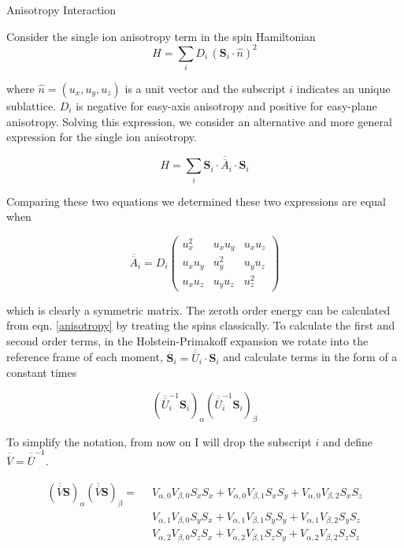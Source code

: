 \documentclass[12pt]{report}
\begin{document}
  
\begin{center}
\Large{Anisotropy Interaction}
\end{center}

Consider the single ion anisotropy term in the spin Hamiltonian
\begin{equation}
H = \sum_i D_i \,(\boldsymbol{S}_i \cdot \hat{n})^2
\end{equation}

where $\hat{n} = \left(u_x,u_y,u_z\right)$ is a unit vector and the subscript
$i$ indicates an unique sublattice. $D_i$ is negative for easy-axis anisotropy
and positive for easy-plane anisotropy. Solving this expression, we consider
an alternative and more general expression for the single ion anisotropy.
 
\begin{equation}
\label{anisotropy}
H = \sum_i \boldsymbol{S}_i \cdot \overline{\overline{A}}_i \cdot \boldsymbol{S}_i
\end{equation}

Comparing these two equations we determined these two expressions are
equal when 

\begin{equation}
\overline{\overline{A}}_i = D_i \left( 
\begin{matrix}
u_x^2 & u_x u_y & u_x u_z \\
u_x u_y & u_y^2 & u_y u_z \\
u_x u_z & u_y u_z & u_z^2
\end{matrix} 
\right)
\end{equation}

which is clearly a symmetric matrix. The zeroth order energy can be calculated from eqn. 
\ref{anisotropy} by treating the spins classically. To calculate the first and second order terms,
in the Holstein-Primakoff expansion we rotate into the reference frame of each moment, 
$\overline{\boldsymbol{S}}_i = \overline{\overline{U}}_i \cdot \boldsymbol{S}_i $ and calculate 
terms in the form of a constant times 

\begin{equation}
\left( \overline{\overline{U}}^{-1}_i \boldsymbol{S}_i \right)_{\alpha}
\left( \overline{\overline{U}}^{-1}_i \boldsymbol{S}_i \right)_{\beta}
\end{equation}

To simplify the notation, from now on I will drop the subscript $i$ and define $\overline{\overline{V}} = \overline{\overline{U}}^{-1}$. 


\begin{align*}
 (\overline{\overline{V}} \boldsymbol{S})_{\alpha} (\overline{\overline{V}} \boldsymbol{S})_{\beta} = \,\,\,
 &V_{\alpha,0} V_{\beta,0} S_x S_x + V_{\alpha,0} V_{\beta,1} S_x S_y +V_{\alpha,0} V_{\beta,2} S_x S_z \\
 &V_{\alpha,1} V_{\beta,0} S_y S_x + V_{\alpha,1} V_{\beta,1} S_y S_y +V_{\alpha,1} V_{\beta,2} S_y S_z \\
  &V_{\alpha,2} V_{\beta,0} S_z S_x + V_{\alpha,2} V_{\beta,1} S_z S_y +V_{\alpha,2} V_{\beta,2} S_z S_z 
 \end{align*} 
\end{document}

